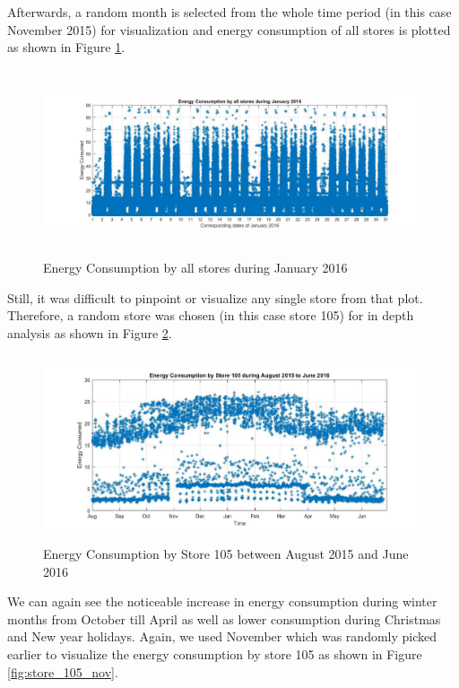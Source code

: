 \documentclass[conference]{IEEEtran}
\begin{document}
Afterwards, a random month is selected from the whole time period (in
this case November 2015) for visualization and energy consumption of all stores is plotted as
shown in Figure \ref{fig:all_stores_nov}.

\begin{figure}[h]
	\centering
	\includegraphics[width=13cm,height=5.5cm]{jan_all_stores.jpg}
	\caption{Energy Consumption by all stores during January 2016}
	\label{fig:all_stores_nov}
\end{figure}

Still, it was difficult to pinpoint or visualize any single store from that
plot. Therefore, a random store was chosen (in this case store 105) for in depth analysis
as shown in Figure \ref{fig:store_105_all}.

\begin{figure}[h]
	\centering
	\includegraphics[width=13cm,height=5.5cm]{store_105_all.jpg}
	\caption{Energy Consumption by Store 105  between August 2015 and June 2016}
	\label{fig:store_105_all}
\end{figure}

We can again see the noticeable increase in energy consumption during
winter months from October till April as well as lower consumption during
Christmas and New year holidays.
Again, we used November which was randomly picked earlier to visualize the
energy consumption by store 105 as shown in Figure \ref{fig:store_105_nov}.
\end{document}
